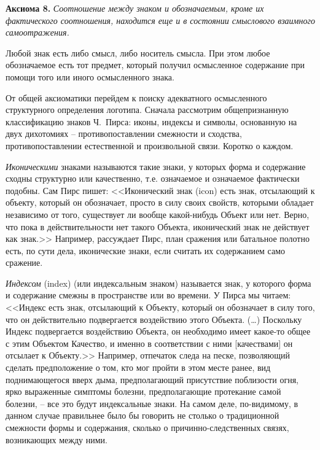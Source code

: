 \textbf{Аксиома 8.} \emph{Соотношение между знаком и обозначаемым, кроме
    их фактического соотношения, находится еще и в состоянии смыслового
    взаимного самоотражения.}

Любой знак есть либо смысл, либо носитель смысла. При этом любое обозначаемое
есть тот предмет, который получил осмысленное содержание при помощи того или
иного осмысленного знака.

От общей аксиоматики перейдем к поиску адекватного осмысленного структурного
определения логотипа. Сначала рассмотрим общепризнанную  классификацию знаков
Ч.~Пирса: иконы, индексы и символы,  основанную на двух дихотомиях --
противопоставлении смежности и сходства, противопоставлении естественной
и произвольной связи\autocite[322]{jakobson1985}. Коротко о каждом.

\emph{Иконическими} знаками называются такие знаки, у которых форма
  и содержание сходны структурно или качественно, т.е. означаемое
  и означаемое фактически подобны. Сам Пирс пишет: <<Иконический знак (icon)
  есть знак, отсылающий к объекту, который он обозначает, просто в силу
  своих свойств, которыми обладает независимо от того, существует ли
  вообще какой-нибудь Объект или нет. Верно, что пока в действительности
  нет такого Объекта, иконический знак не действует как знак.>> \autocite[][185]{jakobson1985}
  Например, рассуждает Пирс, план сражения или батальное полотно есть,
  по сути дела, иконические знаки, если считать их содержанием само сражение.

\emph{Индексом} (index) (или индексальным знаком) называется знак, у которого
  форма и содержание смежны в пространстве или во времени.
  У Пирса мы читаем: <<Индекс есть знак, отсылающий к Объекту, который он
  обозначает в силу того, что он действительно подвергается воздействию
  этого Объекта. (\ldots) Поскольку Индекс подвергается воздействию
  Объекта, он необходимо имеет какое-то общее с этим Объектом Качество,
  и именно в соответствии с ними [качествами] он отсылает к Объекту.>> \autocite[][186]{jakobson1985}
  Например, отпечаток следа на песке, позволяющий сделать предположение о том,
  кто мог пройти в этом месте ранее, вид поднимающегося вверх дыма,
  предполагающий присутствие поблизости огня, ярко выраженные симптомы болезни,
  предполагающие протекание самой болезни, -- все это будут индексальные знаки.
  На самом деле, по-видимому, в данном случае правильнее было бы говорить не
  столько о традиционной смежности формы и содержания, сколько о
  причинно-следственных связях, возникающих между ними.

